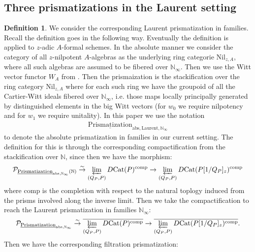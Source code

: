 \documentclass[12pt]{article}
\theoremstyle{definition}
\newtheorem{definition}{Definition}
\begin{document}
\subsection{Three prismatizations in the Laurent setting}

\begin{definition}
We consider the corresponding Laurent prismatization in families. Recall the definition goes in the following way. Eventually the definition is applied to $z$-adic $A$-formal schemes. In the absolute manner we consider the category of all $z$-nilpotent $A$-algebras as the underlying ring categorie $\mathrm{Nil}_{z,A}$, where all such algebras are assumed to be fibered over $\mathbb{N}_\infty$. Then we use the Witt vector functor $W_A$ from \cite{3LH}. Then the prismaization is the stackification over the ring category $\mathrm{Nil}_{z,A}$ where for each such ring we have the groupoid of all the Cartier-Witt ideals fibered over $\mathbb{N}_\infty$, i.e. those maps locally principally generated by distinguished elements in the big Witt vectors (for $w_0$ we require nilpotency and for $w_1$ we require unitality). In this paper we use the notation 
\begin{align}
\underline{\mathrm{Prismatization}}_{\mathrm{abs},\mathrm{Laurent},\mathbb{N}_\infty}
\end{align}
to denote the absolute prismatization in families in our current setting. The definition for this is through the corresponding compactification from the stackification over $\mathbb{N}$, since then we have the morphism:
\begin{align}
\mathcal{P}_{\underline{\mathrm{Prismatization}}_{\mathrm{abs},\mathbb{N}_\infty}(\mathbb{N})} \overset{\sim}{\rightarrow} \varprojlim_{(Q_P,P)} D\mathrm{Cat}(P)^\mathrm{comp}\rightarrow \varprojlim_{(Q_P,P)} D\mathrm{Cat}(P[1/Q_P]_z)^\mathrm{comp}
\end{align}
where $\mathrm{comp}$ is the completion with respect to the natural toplogy induced from the prisms involved along the inverse limit. Then we take the compactification to reach the Laurent prismatization in families $\mathbb{N}_\infty$:
\begin{align}
\mathcal{P}_{\underline{\mathrm{Prismatization}}_{\mathrm{abs},\mathbb{N}_\infty}} \overset{\sim}{\rightarrow} \overline{\varprojlim_{(Q_P,P)} D\mathrm{Cat}(P)^\mathrm{comp}}\rightarrow \overline{\varprojlim_{(Q_P,P)} D\mathrm{Cat}(P[1/Q_P]_z)^\mathrm{comp}}.
\end{align}
Then we have the corresponding filtration prismatization:

\end{definition}
\end{document}
